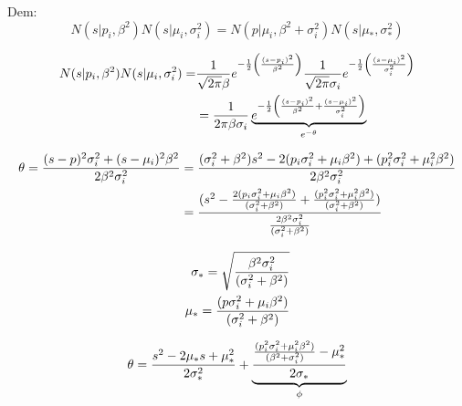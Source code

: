\documentclass[11pt,twoside, spanish]{report} %
\begin{document}
Dem:
\begin{equation}N(s \vert p_i,\beta^2) N(s \vert \mu_i,\sigma_i^2) = N(p \vert \mu_i,\beta^2+\sigma_i^2) N(s \vert \mu_{\ast},\sigma_{\ast}^2)
\end{equation}

\begin{equation}
	\centering
	\begin{split}
		N(s \vert p_i,\beta^2) N(s \vert \mu_i,\sigma_i^2) =
		& \frac{1}{\sqrt{2\pi} \beta}e^{-\frac{1}{2}\left(\frac{(s-p_i)^2}{\beta^2}\right)}\frac{1}{\sqrt{2\pi} \sigma_i}e^{-\frac{1}{2}\left(\frac{(s-\mu_i)^2}{\sigma_i^2}\right)} \\
		& = \frac{1}{2\pi\beta\sigma_i}\underbrace{e^{-\frac{1}{2}\left(\frac{(s-p_i)^2}{\beta^2}+\frac{(s-\mu_i)^2}{\sigma_i^2}\right)}}_{e^{-\theta}}
	\end{split}
\end{equation}

\begin{equation}
	\centering
	\begin{split}
		\theta = \frac{(s-p)^2\sigma_{i}^2+(s-\mu_i)^2\beta^2}{2\beta^2\sigma_i^2}
		& = \frac{(\sigma_i^2+\beta^2)s^2-2(p_i\sigma_i^2+\mu_i\beta^2)+(p_i^2\sigma_{i}^2+\mu_{i}^2\beta^2)}{2\beta^2\sigma_{i}^2} \\
		& =\frac{(s^2-\frac{2(p_i\sigma_{i}^2+\mu_i\beta^2)}{(\sigma_{i}^2+\beta^2)}+\frac{(p_{i}^2\sigma_{i}^2+\mu_{i}^2\beta^2)}{(\sigma_i^2+\beta^2)})}{\frac{2\beta^2\sigma_{i}^2}{(\sigma_{i}^2+\beta^2)}}
	\end{split}
\end{equation}


\begin{equation}
	\centering
	\begin{split}
		\sigma_{\ast}=\sqrt{\frac{\beta^2\sigma_i^2}{(\sigma_i^2+\beta^2)}}\\
		\mu_{\ast}=\frac{(p\sigma_i^2+\mu_i\beta^2)}{(\sigma_i^2+\beta^2)}
	\end{split}
\end{equation}

\begin{equation}
	\centering
	\begin{split}
		\theta =\frac{s^2-2\mu_{\ast}s+\mu_{\ast}^2}{2\sigma_{\ast}^2} + \underbrace{\frac{\frac{(p_i^2\sigma_i^2+\mu_i^2\beta^2)}{(\beta^2+\sigma_i^2)}-\mu_{\ast}^2}{2\sigma_{\ast}}}_{\phi}
	\end{split}
\end{equation}
\end{document}
